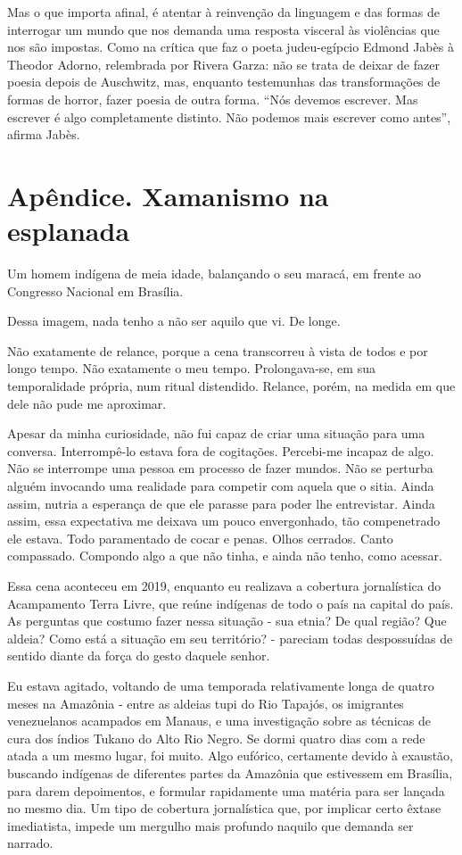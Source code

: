 Mas o que importa afinal, é atentar à reinvenção da linguagem e das
formas de interrogar um mundo que nos demanda uma resposta visceral às
violências que nos são impostas. Como na crítica que faz o poeta
judeu-egípcio Edmond Jabès à Theodor Adorno, relembrada por Rivera
Garza: não se trata de deixar de fazer poesia depois de Auschwitz, mas,
enquanto testemunhas das transformações de formas de horror, fazer
poesia de outra forma. ``Nós devemos escrever. Mas escrever é algo
completamente distinto. Não podemos mais escrever como antes'', afirma
Jabès.

\chapter{Apêndice. Xamanismo na esplanada}

Um homem indígena de meia idade, balançando o seu maracá, em frente ao
Congresso Nacional em Brasília.

Dessa imagem, nada tenho a não ser aquilo que vi. De longe.

Não exatamente de relance, porque a cena transcorreu à vista de todos e
por longo tempo. Não exatamente o meu tempo. Prolongava-se, em sua
temporalidade própria, num ritual distendido. Relance, porém, na medida
em que dele não pude me aproximar.

Apesar da minha curiosidade, não fui capaz de criar uma situação para
uma conversa. Interrompê-lo estava fora de cogitações. Percebi-me
incapaz de algo. Não se interrompe uma pessoa em processo de fazer
mundos. Não se perturba alguém invocando uma realidade para competir com
aquela que o sitia. Ainda assim, nutria a esperança de que ele parasse
para poder lhe entrevistar. Ainda assim, essa expectativa me deixava um
pouco envergonhado, tão compenetrado ele estava. Todo paramentado de
cocar e penas. Olhos cerrados. Canto compassado. Compondo algo a que não
tinha, e ainda não tenho, como acessar.

Essa cena aconteceu em 2019, enquanto eu realizava a cobertura
jornalística do Acampamento Terra Livre, que reúne indígenas de todo o
país na capital do país. As perguntas que costumo fazer nessa situação -
sua etnia? De qual região? Que aldeia? Como está a situação em seu
território? - pareciam todas despossuídas de sentido diante da força do
gesto daquele senhor.

Eu estava agitado, voltando de uma temporada relativamente longa de
quatro meses na Amazônia - entre as aldeias tupi do Rio Tapajós, os
imigrantes venezuelanos acampados em Manaus, e uma investigação sobre as
técnicas de cura dos índios Tukano do Alto Rio Negro. Se dormi quatro
dias com a rede atada a um mesmo lugar, foi muito. Algo eufórico,
certamente devido à exaustão, buscando indígenas de diferentes partes da
Amazônia que estivessem em Brasília, para darem depoimentos, e formular
rapidamente uma matéria para ser lançada no mesmo dia. Um tipo de
cobertura jornalística que, por implicar certo êxtase imediatista,
impede um mergulho mais profundo naquilo que demanda ser narrado.

